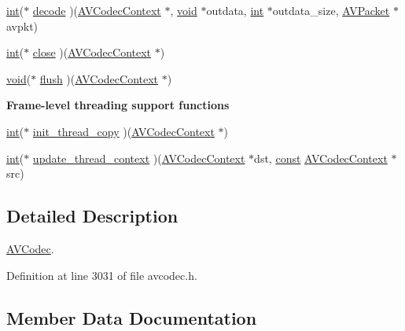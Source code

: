\begin{DoxyCompactItemize}
\item 
\hyperlink{xmltok_8h_a5a0d4a5641ce434f1d23533f2b2e6653}{int}($\ast$ \hyperlink{struct_a_v_codec_a2e8ca285370a79a060026b9c36f65f0d}{decode} )(\hyperlink{struct_a_v_codec_context}{A\+V\+Codec\+Context} $\ast$, \hyperlink{sound_8c_ae35f5844602719cf66324f4de2a658b3}{void} $\ast$outdata, \hyperlink{xmltok_8h_a5a0d4a5641ce434f1d23533f2b2e6653}{int} $\ast$outdata\+\_\+size, \hyperlink{struct_a_v_packet}{A\+V\+Packet} $\ast$avpkt)
\item 
\hyperlink{xmltok_8h_a5a0d4a5641ce434f1d23533f2b2e6653}{int}($\ast$ \hyperlink{struct_a_v_codec_a7e200e27b37d64d1f941260aeffeb265}{close} )(\hyperlink{struct_a_v_codec_context}{A\+V\+Codec\+Context} $\ast$)
\item 
\hyperlink{sound_8c_ae35f5844602719cf66324f4de2a658b3}{void}($\ast$ \hyperlink{struct_a_v_codec_a70d96d86e4c055f218d5164f94685647}{flush} )(\hyperlink{struct_a_v_codec_context}{A\+V\+Codec\+Context} $\ast$)
\end{DoxyCompactItemize}
\begin{Indent}{\bf Frame-\/level threading support functions}\par
\begin{DoxyCompactItemize}
\item 
\hyperlink{xmltok_8h_a5a0d4a5641ce434f1d23533f2b2e6653}{int}($\ast$ \hyperlink{struct_a_v_codec_a7f9ba73a1d649c453a34b33d15ad99c3}{init\+\_\+thread\+\_\+copy} )(\hyperlink{struct_a_v_codec_context}{A\+V\+Codec\+Context} $\ast$)
\item 
\hyperlink{xmltok_8h_a5a0d4a5641ce434f1d23533f2b2e6653}{int}($\ast$ \hyperlink{struct_a_v_codec_a286e505d913763a6bb9ea2bfee00f2c3}{update\+\_\+thread\+\_\+context} )(\hyperlink{struct_a_v_codec_context}{A\+V\+Codec\+Context} $\ast$dst, \hyperlink{getopt1_8c_a2c212835823e3c54a8ab6d95c652660e}{const} \hyperlink{struct_a_v_codec_context}{A\+V\+Codec\+Context} $\ast$src)
\end{DoxyCompactItemize}
\end{Indent}


\subsection{Detailed Description}
\hyperlink{struct_a_v_codec}{A\+V\+Codec}. 

Definition at line 3031 of file avcodec.\+h.



\subsection{Member Data Documentation}
